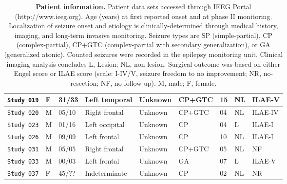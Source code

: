 \begin{table}[H]
\begin{tabular}{|x{2cm}|x{0.5cm}|x{0.75cm}|x{2cm}|x{1.5cm}|x{1.25cm}|x{1cm}|x{1cm}|x{1.40cm}|}
        \verb|Study 019|     & F & 31/33 & Left temporal & Unknown & CP+GTC & 15 & NL & ILAE-V\\ \hline
        \verb|Study 020|     & M & 05/10 & Right frontal & Unknown & CP+GTC & 04 & NL & ILAE-IV\\ \hline
        \verb|Study 023|     & M & 01/16 & Left occipital & Unknown & CP & 04 & L & ILAE-I\\ \hline
        \verb|Study 026|     & M & 09/09 & Left frontal & Unknown & CP & 10 & NL & ILAE-I\\ \hline
        \verb|Study 031|     & M & 05/05 & Right frontal & Unknown & CP+GTC & 05 & NL & NF\\ \hline
        \verb|Study 033|     & M & 00/03 & Left frontal & Unknown & GA & 07 & L & ILAE-V\\ \hline
        \verb|Study 037|     & F & 45/?? & Indeterminate & Unknown & CP & 02 & NL & NR\\ \hline
    \end{tabular}
    \caption[Patient data set for Chapter \ref{ch:mapsubnet}]{\textbf{Patient information.} Patient data sets accessed through IEEG Portal (http://www.ieeg.org). Age (years) at first reported onset and at phase II monitoring. Localization of seizure onset and etiology is clinically-determined through medical history, imaging, and long-term invasive monitoring. Seizure types are SP (simple-partial), CP (complex-partial), CP+GTC (complex-partial with secondary generalization), or GA (generalized atonic). Counted seizures were recorded in the epilepsy monitoring unit. Clinical imaging analysis concludes L, Lesion; NL, non-lesion. Surgical outcome was based on either Engel score or ILAE score (scale: I-IV/V, seizure freedom to no improvement; NR, no-resection; NF, no follow-up). M, male; F, female. \label{ch4:tab1}}
\end{table}

